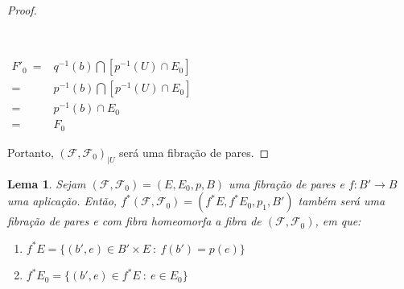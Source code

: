 \documentclass[12pt,oneside]{book} %
\newtheorem{lem}    {\hspace{0.5cm}Lema}[chapter]
\begin{document}
\begin{proof}
	\
	
	\
	
	$\begin{array}{rl}
		F'_{0} \ = & q^{-1}(b)\bigcap [p^{-1}(U)\cap E_{0}] \\
		= & p^{-1}(b)\bigcap [p^{-1}(U)\cap E_{0}] \\
		= & p^{-1}(b)\cap E_{0} \\
		= & F_{0}
	\end{array}$ \newline
	
	\par Portanto, $(\mathcal{F},\mathcal{F}_{0})_{|U}$ será uma fibração de pares.
	
\end{proof}

\begin{lem}\label{pf_pullback}
	Sejam $(\mathcal{F},\mathcal{F}_{0})=(E,E_{0},p,B)$ uma fibração de pares e $f:B'\to B$ uma aplicação. Então, $f^{*}(\mathcal{F},\mathcal{F}_{0})=(f^{*}E,f^{*}E_{0},p_{1},B')$ também será uma fibração de pares e com fibra homeomorfa a fibra de $(\mathcal{F},\mathcal{F}_{0})$, em que:
	
	\begin{enumerate}
		\item $f^{*}E=\{ (b',e)\in B'\times E \ : \ f(b')=p(e) \}$
		\item $f^{*}E_{0}=\{ (b',e)\in f^{*}E \ : \ e\in E_{0} \}$
	\end{enumerate}
	
\end{lem}
\end{document}
